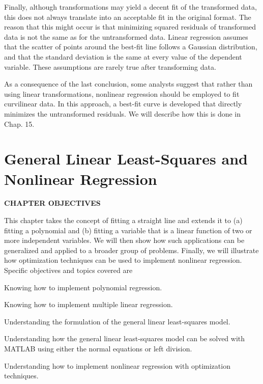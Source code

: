 \documentclass[../main.tex]{subfiles}
\begin{document}
Finally, although transformations may yield a decent fit of the transformed data, this does not always translate into an acceptable fit in the original format. The reason that this might occur is that minimizing squared residuals of transformed data is not the same as for the untransformed data. Linear regression assumes that the scatter of points around the best-fit line follows a Gaussian distribution,  and that the standard deviation is the same at every value of the dependent variable. These assumptions are rarely true after transforming data. 

As a consequence of the last conclusion, some analysts suggest that rather than using linear transformations, nonlinear regression should be employed to fit curvilinear data. In this approach, a best-fit curve is developed that directly minimizes the untransformed residuals. We will describe how this is done in Chap. 15. %


\label{cha:cha_P_15} %
\chapter{General Linear Least-Squares and Nonlinear Regression}
\textbf{CHAPTER OBJECTIVES}

\noindent This chapter takes the concept of fitting a straight line and extends it to (a) fitting a polynomial and (b) fitting a variable that is a linear function of two or more independent variables. We will then show how such applications can be generalized and applied to a broader group of problems. Finally, we will illustrate how optimization techniques can be used to implement nonlinear regression. Specific objectives and topics covered are

\begin{list}{•}{}
	\item Knowing how to implement polynomial regression.
	\item Knowing how to implement multiple linear regression. %
	\item Understanding the formulation of the general linear least-squares model.
	\item Understanding how the general linear least-squares model can be solved with MATLAB using either the normal equations or left division.
	\item Understanding how to implement nonlinear regression with optimization techniques.
\end{list}
\end{document}
